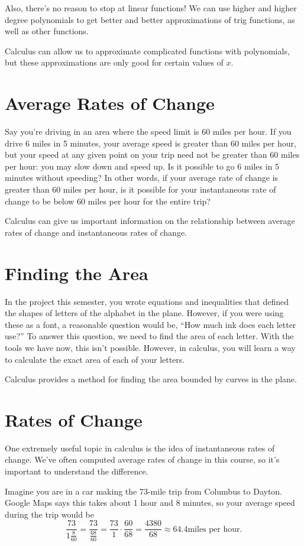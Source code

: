 \documentclass{ximera}
\begin{document}
Also, there's no reason to stop at linear functions! We can use higher and higher degree polynomials to get better and better approximations of trig functions, as well as other functions. 

Calculus can allow us to approximate complicated functions with polynomials, but these approximations are only good for certain values of $x$. 

\section{Average Rates of Change}
Say you're driving in an area where the speed limit is 60 miles per hour. If you drive 6 miles in 5 minutes, your average speed is greater than 60 miles per hour, but your speed at any given point on your trip need not be greater than 60 miles per hour: you may slow down and speed up. Is it possible to go 6 miles in 5 minutes without speeding? In other words, if your average rate of change is greater than 60 miles per hour, is it possible for your instantaneous rate of change to be below 60 miles per hour for the entire trip?

Calculus can give us important information on the relationship between average rates of change and instantaneous rates of change. 

\section{Finding the Area}
In the project this semester, you wrote equations and inequalities that defined the shapes of letters of the alphabet in the plane. However, if you were using these as a font, a reasonable question would be, ``How much ink does each letter use?'' To answer this question, we need to find the area of each letter. With the tools we have now, this isn't possible. However, in calculus, you will learn a way to calculate the exact area of each of your letters.

Calculus provides a method for finding the area bounded by curves in the plane.


\section{Rates of Change}
One extremely useful topic in calculus is the idea of instantaneous rates of change. We've often computed average rates of change in this course, so it's important to understand the difference.

Imagine you are in a car making the 73-mile trip from Columbus to Dayton. Google Maps says this takes about 1 hour and 8 minutes, so your average speed during the trip would be 
$$
\frac{73}{1\frac{8}{60}} = \frac{73}{\frac{68}{60}} = \frac{73}{1} \cdot \frac{60}{68} = \frac{4380}{68} \approx 64.4 \text{miles per hour}.
$$
\end{document}
